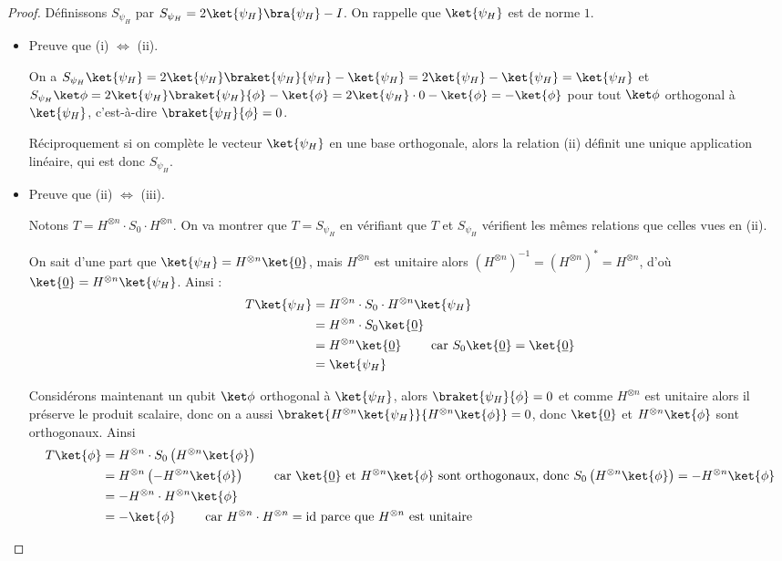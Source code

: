 \documentclass[11pt,class=report,crop=false]{standalone}
\begin{document}
\begin{proof}
Définissons $S_{\psi_H}$ par $S_{\psi_H} = 2 \ket{\psi_H} \bra{\psi_H} - I$.
On rappelle que $\ket{\psi_H}$ est de norme $1$.
\begin{itemize}
  \item Preuve que (i) $\iff$ (ii). 

On a  $S_{\psi_H}\ket{\psi_H} = 2 \ket{\psi_H} \braket{\psi_H}{\psi_H} - \ket{\psi_H} = 2 \ket{\psi_H} - \ket{\psi_H} = \ket{\psi_H} $
et $S_{\psi_H}\ket\phi = 2 \ket{\psi_H} \braket{\psi_H}{\phi} - \ket{\phi}
= 2 \ket{\psi_H}  \cdot 0 - \ket{\phi} = -\ket{\phi}$ pour tout $\ket\phi$  orthogonal à $\ket{\psi_H}$, c'est-à-dire $\braket{\psi_H}{\phi}=0$.

Réciproquement si on complète le vecteur $\ket{\psi_H}$ en une base orthogonale, alors la relation (ii) définit une unique application linéaire, qui est donc $S_{\psi_H}$.

  \item Preuve que (ii) $\iff$ (iii). 

Notons $T = H^{\otimes n} \cdot S_0 \cdot H^{\otimes n}$. On va montrer que $T=S_{\psi_H}$ en vérifiant que $T$ et $S_{\psi_H}$ vérifient les mêmes relations que celles vues en (ii).

 On sait d'une part que  $\ket{\psi_H} = H^{\otimes n} \ket{\underline0}$,
mais $H^{\otimes n}$ est unitaire alors $(H^{\otimes n})^{-1} = (H^{\otimes n})^* = H^{\otimes n}$, d'où $\ket{\underline0}= H^{\otimes n} \ket{\psi_H}$.
Ainsi :
\begin{align*}
T \ket{\psi_H} 
  &= H^{\otimes n} \cdot S_0 \cdot H^{\otimes n} \ket{\psi_H} \\
  &= H^{\otimes n} \cdot S_0 \ket{\underline0} \\
  &= H^{\otimes n} \ket{\underline0} \qquad \text{ car } S_0 \ket{\underline0} = \ket{\underline0}\\
  &= \ket{\psi_H} \\
\end{align*}

Considérons maintenant un qubit $\ket\phi$ orthogonal à $\ket{\psi_H}$,
alors $\braket{\psi_H}{\phi}=0$ et comme $H^{\otimes n}$ est unitaire alors
il préserve le produit scalaire, donc on a aussi $\braket{H^{\otimes n}\ket{\psi_H}}{H^{\otimes n}\ket{\phi}}=0$,
donc $\ket{\underline0}$ et $H^{\otimes n}\ket{\phi}$ sont orthogonaux.
Ainsi 
\begin{align*}
T \ket{\phi} 
  &= H^{\otimes n} \cdot S_0 \left( H^{\otimes n} \ket{\phi} \right) \\
  &= H^{\otimes n}  \left(- H^{\otimes n} \ket{\phi} \right) \qquad \text{ car $\ket{\underline0}$ et $H^{\otimes n}\ket{\phi}$ sont orthogonaux, donc $S_0 \left( H^{\otimes n}\ket{\phi}\right) = - H^{\otimes n} \ket{\phi}$} \\
  &= - H^{\otimes n} \cdot H^{\otimes n}  \ket{\phi} \\
  &= -\ket{\phi} \qquad \text{ car $H^{\otimes n} \cdot H^{\otimes n} = \text{id}$ parce que $H^{\otimes n}$ est unitaire} \\
\end{align*}


\end{itemize}
\end{proof}
\end{document}

